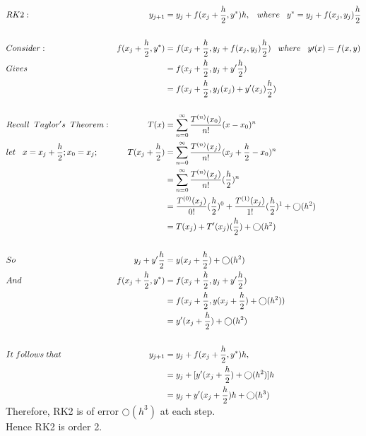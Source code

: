 \documentclass[12pt]{article}
\begin{document}
	$
	\begin{aligned}
	&RK2:  
	&y_{j+1} 
	&= y_{j} + f(x_{j}+\frac{h}{2} , y^{*}){h} ,\hspace{3mm} where\hspace{3mm} y^{*} = y_{j} + f(x_{j},y_{j}){\frac{h}{2}}  
	\\	
	\\
	&Consider:
	&f(x_{j}+\frac{h}{2} , y^{*})
	&=f(x_{j}+\frac{h}{2} , y_{j} + f(x_{j},y_{j}){\frac{h}{2}}) 
	\hspace{3mm} where\hspace{3mm} y\prime(x)=f(x,y)
	\\
	&Gives 
	&&=f(x_{j}+\frac{h}{2} , y_{j} + y^{\prime}{\frac{h}{2}}) 
	\\ 
	&&&=f(x_{j}+\frac{h}{2} , y_{j}(x_{j}) + y^{\prime}(x_{j}){\frac{h}{2}}) 
	\\
	\\ 
	&Recall \hspace{2mm} Taylor's \hspace{2mm} Theorem: 
	&T(x)
	&=\sum\limits_{n=0}^\infty \frac{T^{(n)}(x_{0})}{n!}(x-x_{0})^{n}
	\\ 
	&let\hspace{3mm} x=x_{j}+\frac{h}{2} ; x_{0}=x_{j}; 
	&T(x_{j}+\frac{h}{2})
	&=\sum\limits_{n=0}^\infty \frac{T^{(n)}(x_{j})}{n!}(x_{j}+\frac{h}{2}-x_{0})^{n}
	\\
	&&&=\sum\limits_{n=0}^\infty \frac{T^{(n)}(x_{j})}{n!}(\frac{h}{2})^{n}
	\\
	&&&=\frac{T^{(0)}(x_{j})}{0!}(\frac{h}{2})^{0} + \frac{T^{(1)}(x_{j})}{1!}(\frac{h}{2})^{1} + \bigcirc(h^{2})
	\\
	&&&=T(x_{j}) + T^{\prime}(x_{j})(\frac{h}{2}) + \bigcirc(h^{2})
	\\
	\\
	&So 
	&y_{j} + y^{\prime}{\frac{h}{2}} 
	&= y(x_{j}+\frac{h}{2})+ \bigcirc(h^{2})
	\\
	&And 
	&f(x_{j}+\frac{h}{2} , y^{*})
	&=f(x_{j}+\frac{h}{2} , y_{j} + y^{\prime}{\frac{h}{2}})
	\\
	&&&=f(x_{j}+\frac{h}{2} , y(x_{j}+\frac{h}{2})+ \bigcirc(h^{2}))
	\\
	&&&=y^{\prime}(x_{j}+\frac{h}{2})+ \bigcirc(h^{2})
	\\
	\\
	&It \hspace{1mm}follows\hspace{1mm} that 
	&y_{j+1} 
	&= y_{j} + f(x_{j}+\frac{h}{2} , y^{*}){h} ,
	\\
	&&&=y_{j} + [y^{\prime}(x_{j}+\frac{h}{2})+ \bigcirc(h^{2})]h
	\\
	&&&=y_{j} + y^{\prime}(x_{j}+\frac{h}{2})h+ \bigcirc(h^{3})
	\end{aligned}
	$
	\\
	Therefore, RK2 is of error $\bigcirc(h^{3})$ at each step. \\
	Hence RK2 is order 2.
	
\end{document}
